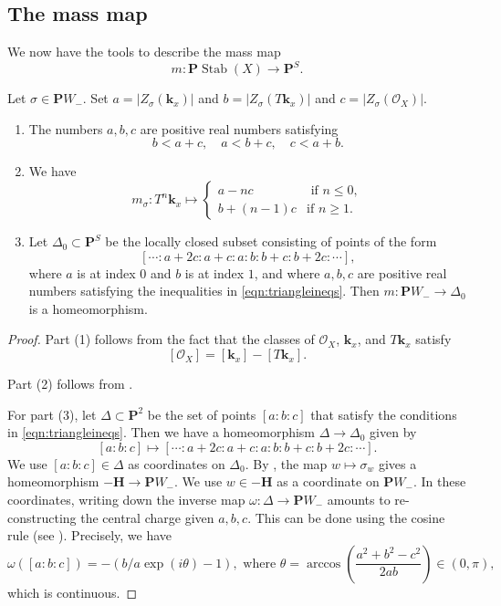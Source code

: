 \documentclass{amsart}
\begin{document}
\subsection{The mass map}
We now have the tools to describe the mass map
\[ m \colon \mathbf{P} \operatorname{Stab}(X) \to \mathbf{P}^S.\]
\begin{proposition}\label{prop:triangle0}
  Let \(\sigma \in \mathbf{P} W_{-}\).
  Set \(a = |Z_{\sigma}(\mathbf{k}_x)|\) and \(b = |Z_{\sigma}(T \mathbf{k}_{x})|\) and \(c = |Z_{\sigma}(\mathcal{O}_X)|\).
  \begin{enumerate}
  \item \label{eqn:triangleineqs}   The numbers \(a, b, c\) are positive real numbers satisfying
   \[
    b < a + c, \quad a < b+c, \quad c < a + b.
   \]
  \item We have
  \[ m_{\sigma} \colon T^n \mathbf{k}_x \mapsto
    \begin{cases}
      a - n c &\text{ if } n \leq 0,\\
      b + (n-1) c & \text{if } n \geq 1.
    \end{cases}
  \]
  \item Let \(\Delta_{0} \subset \mathbf{P}^S\) be the locally closed subset consisting of points of the form
   \[ [\cdots :a+2c:a+c:a:b:b+c:b+2c: \cdots],\]
   where \(a\) is at index 0 and \(b\) is at index \(1\), and where \(a,b,c\) are positive real numbers satisfying the inequalities in \eqref{eqn:triangleineqs}.
   Then \(m \colon \mathbf{P}W_{-} \to \Delta_{0}\) is a homeomorphism.
 \end{enumerate}
\end{proposition}
\begin{proof}
  Part (1) follows from the fact that the classes of \(\mathcal{O}_X\), \(\mathbf{k}_x\), and \(T \mathbf{k}_x\) satisfy
  \[ [\mathcal{O}_X] = [\mathbf{k}_x] - [T \mathbf{k}_x].\]

  Part (2) follows from .

  For part (3), let \(\Delta \subset \mathbf{P}^2\) be the set of points \([a:b:c]\) that satisfy the conditions in \eqref{eqn:triangleineqs}.
  Then we have a homeomorphism \(\Delta \to \Delta_0\) given by
  \[ [a:b:c] \mapsto [\cdots:a+2c:a+c:a:b:b+c:b+2c:\cdots].\]
  We use \([a:b:c] \in \Delta\) as coordinates on \(\Delta_0\).
  By , the map \(w \mapsto \sigma_w\) gives a homeomorphism \(-\mathbf{H} \to \mathbf{P} W_{-}\).
  We use \(w \in -\mathbf{H}\) as a coordinate on \(\mathbf{P} W_-\).
  In these coordinates, writing down the inverse map \(\omega \colon \Delta \to \mathbf{P}W_-\) amounts to re-constructing the central charge given \(a,b,c\).
  This can be done using the cosine rule (see ).
  Precisely, we have
  \begin{equation}\label{eqn:inv-}
    \omega([a:b:c]) = - (b/a \exp(i \theta) - 1), \text{ where } \theta = \arccos \left( \frac{a^2+b^2-c^2}{2ab} \right) \in (0,\pi),
  \end{equation}
  which is continuous.
  \end{proof}
\end{document}
